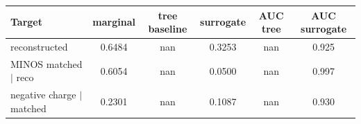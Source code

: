 \begin{tabular}{lccccc}
\toprule
Target & marginal & tree baseline & surrogate & AUC tree & AUC surrogate \\
\midrule
reconstructed & 0.6484 & nan & 0.3253 & nan & 0.925 \\
MINOS matched $\mid$ reco & 0.6054 & nan & 0.0500 & nan & 0.997 \\
negative charge $\mid$ matched & 0.2301 & nan & 0.1087 & nan & 0.930 \\
\bottomrule
\end{tabular}

